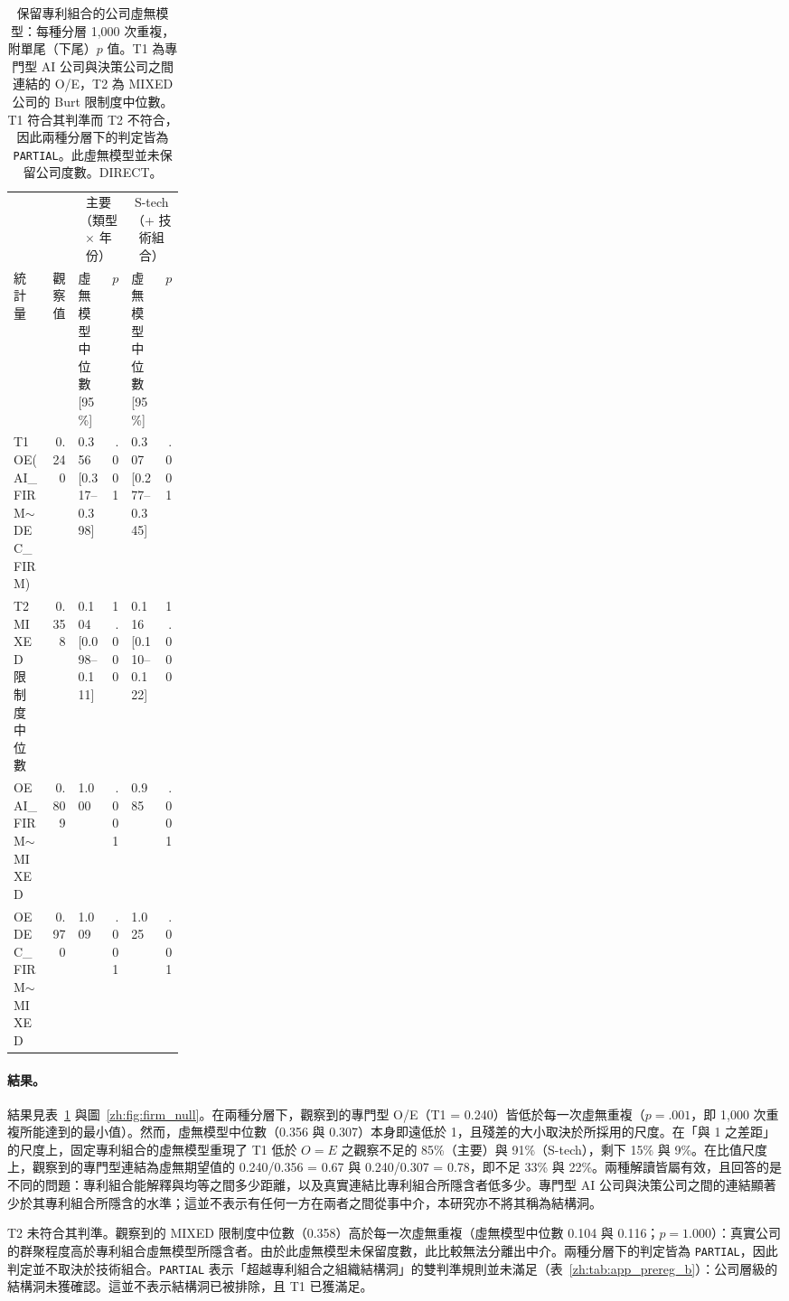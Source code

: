 \begin{table}[tbp]
  \centering
  \small
  \caption{保留專利組合的公司虛無模型：每種分層 1,000 次重複，附單尾（下尾）$p$ 值。T1 為專門型 AI 公司與決策公司之間連結的 O/E，T2 為 MIXED 公司的 Burt 限制度中位數。T1 符合其判準而 T2 不符合，因此兩種分層下的判定皆為 \texttt{PARTIAL}。此虛無模型並未保留公司度數。DIRECT。}
  \label{zh:tab:firm_null}
  \footnotesize
  \setlength{\tabcolsep}{4pt}
  \begin{tabular}{p{0.22\linewidth}rlrlr}
    \toprule
    & & \multicolumn{2}{c}{主要（類型 $\times$ 年份）} & \multicolumn{2}{c}{S-tech（+ 技術組合）} \\
    統計量 & 觀察值 & 虛無模型中位數 [95\%] & $p$ & 虛無模型中位數 [95\%] & $p$ \\
    \midrule
    T1 OE(AI\_FIRM$\sim$\allowbreak DEC\_FIRM) & 0.240 & 0.356 [0.317--0.398] & .001 & 0.307 [0.277--0.345] & .001 \\
    T2 MIXED 限制度中位數 & 0.358 & 0.104 [0.098--0.111] & 1.000 & 0.116 [0.110--0.122] & 1.000 \\
    OE AI\_FIRM$\sim$\allowbreak MIXED & 0.809 & 1.000 & .001 & 0.985 & .001 \\
    OE DEC\_FIRM$\sim$\allowbreak MIXED & 0.970 & 1.009 & .001 & 1.025 & .001 \\
    \bottomrule
  \end{tabular}
\end{table}

\paragraph{結果。} 結果見表~\ref{zh:tab:firm_null} 與圖~\ref{zh:fig:firm_null}。在兩種分層下，觀察到的專門型 O/E（T1 = 0.240）皆低於每一次虛無重複（$p = .001$，即 1,000 次重複所能達到的最小值）。然而，虛無模型中位數（0.356 與 0.307）本身即遠低於 1，且殘差的大小取決於所採用的尺度。在「與 1 之差距」的尺度上，固定專利組合的虛無模型重現了 T1 低於 $O = E$ 之觀察不足的 85\%（主要）與 91\%（S-tech），剩下 15\% 與 9\%。在比值尺度上，觀察到的專門型連結為虛無期望值的 0.240/0.356 = 0.67 與 0.240/0.307 = 0.78，即不足 33\% 與 22\%。兩種解讀皆屬有效，且回答的是不同的問題：專利組合能解釋與均等之間多少距離，以及真實連結比專利組合所隱含者低多少。專門型 AI 公司與決策公司之間的連結顯著少於其專利組合所隱含的水準；這並不表示有任何一方在兩者之間從事中介，本研究亦不將其稱為結構洞。

T2 未符合其判準。觀察到的 MIXED 限制度中位數（0.358）高於每一次虛無重複（虛無模型中位數 0.104 與 0.116；$p = 1.000$）：真實公司的群聚程度高於專利組合虛無模型所隱含者。由於此虛無模型未保留度數，此比較無法分離出中介。兩種分層下的判定皆為 \texttt{PARTIAL}，因此判定並不取決於技術組合。\texttt{PARTIAL} 表示「超越專利組合之組織結構洞」的雙判準規則並未滿足（表~\ref{zh:tab:app_prereg_b}）：公司層級的結構洞未獲確認。這並不表示結構洞已被排除，且 T1 已獲滿足。

